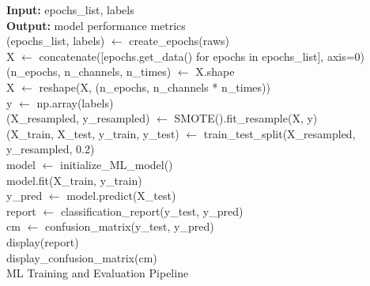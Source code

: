 \begin{algorithm}
	\textbf{Input:} epochs\_list, labels\\
	\textbf{Output:} model performance metrics\\
	
	(epochs\_list, labels) $\gets$ create\_epochs(raws)\\
	X $\gets$ concatenate([epochs.get\_data() for epochs in epochs\_list], axis=0)\\
	(n\_epochs, n\_channels, n\_times) $\gets$ X.shape\\
	X $\gets$ reshape(X, (n\_epochs, n\_channels * n\_times))\\
	y $\gets$ np.array(labels)\\
	(X\_resampled, y\_resampled) $\gets$ SMOTE().fit\_resample(X, y)\\
	(X\_train, X\_test, y\_train, y\_test) $\gets$ train\_test\_split(X\_resampled, y\_resampled, 0.2)\\
	model $\gets$ initialize\_ML\_model()\\
	model.fit(X\_train, y\_train)\\
	y\_pred $\gets$ model.predict(X\_test)\\
	report $\gets$ classification\_report(y\_test, y\_pred)\\
	cm $\gets$ confusion\_matrix(y\_test, y\_pred)\\
	display(report)\\
	display\_confusion\_matrix(cm)\\
	\caption{ML Training and Evaluation Pipeline}
\end{algorithm}

	
	
